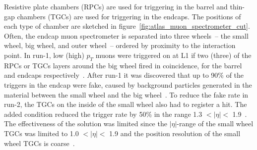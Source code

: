 Resistive plate chambers (RPCs) are used for triggering in the barrel and thin-gap chambers (TGCs) are used for triggering in the endcaps. The positions of each type of chamber are sketched in figure~\ref{fig:atlas_muon_spectrometer_cut}. Often, the endcap muon spectrometer is separated into three wheels~-- the small wheel, big wheel, and outer wheel~-- ordered by proximity to the interaction point. In run-1, low (high) $p_T$ muons were triggered on at L1 if two (three) of the RPCs or TGCs layers around the big wheel fired in coincidence, for the barrel and endcaps respectively~\cite{atlas_l1_trigger_tdr}. After run-1 it was discovered that up to 90\% of the triggers in the endcap were fake, caused by background particles generated in the material between the small wheel and the big wheel~\cite{nsw_tdr}.  To reduce the fake rate in run-2, the TGCs on the inside of the small wheel also had to register a hit. The added condition reduced the trigger rate by 50\% in the range 1.3 $< |\eta| <$ 1.9~\cite{martinez_run-2_2016}. The effectiveness of the solution was limited since the $|\eta|$-range of the small wheel TGCs was limited to 1.0 $< |\eta| <$ 1.9 and the position resolution of the small wheel TGCs is coarse~\cite{nsw_tdr}.


